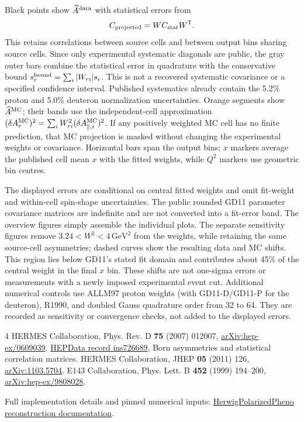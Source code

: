 \documentclass[10pt,a4paper]{article}
\newcommand{\gev}{\mathrm{GeV}}
\begin{document}
Black points show $\widehat A^{\rm data}$ with statistical errors from
\begin{equation}
 C_{\rm projected}=W C_{\rm stat} W^{\mathsf T}.
\end{equation}
This retains correlations between source cells and between output bins sharing
source cells. Since only experimental systematic diagonals are public, the gray
outer bars combine the statistical error in quadrature with the conservative
bound $s_r^{\rm bound}=\sum_i|W_{ri}|s_i$. This is not a recovered systematic
covariance or a specified confidence interval. Published systematics already
contain the 5.2\% proton and 5.0\% deuteron normalization uncertainties.
Orange segments show $\widehat A^{\rm MC}$; their bands use the independent-cell
approximation $(\delta A_r^{\rm MC})^2=\sum_iW_{ri}^2(\delta A_{\parallel,i}^{\rm MC})^2$.
If any positively weighted MC cell has no finite prediction, that MC projection
is masked without changing the experimental weights or covariance.
Horizontal bars span the output bins; $x$ markers average the published cell
mean $x$ with the fitted weights, while $Q^2$ markers use geometric bin centres.

The displayed errors are conditional on central fitted weights and omit
fit-weight and within-cell spin-shape uncertainties. The public rounded GD11
parameter covariance matrices are indefinite and are not converted into a
fit-error band. The overview figures simply assemble the individual plots.
The separate sensitivity figures remove $3.24<W^2<4\,\gev^2$ from the weights,
while retaining the same source-cell asymmetries; dashed curves show the
resulting data and MC shifts. This region lies below GD11's stated fit domain
and contributes about 45\% of the central weight in the final $x$ bin.
These shifts are not one-sigma errors or measurements with a newly imposed
experimental event cut. Additional numerical controls use ALLM97 proton weights
(with GD11-D/GD11-P for the deuteron), R1990, and doubled Gauss quadrature order
from 32 to 64. They are recorded as sensitivity or convergence checks, not
added to the displayed errors.

\small
\begin{thebibliography}{4}
\setlength{\itemsep}{0pt}
 HERMES Collaboration, Phys. Rev. D \textbf{75} (2007) 012007,
\href{https://arxiv.org/abs/hep-ex/0609039}{arXiv:hep-ex/0609039}.
 \href{https://www.hepdata.net/record/ins726689}{HEPData record ins726689},
Born asymmetries and statistical correlation matrices.
 HERMES Collaboration, JHEP \textbf{05} (2011) 126,
\href{https://arxiv.org/abs/1103.5704}{arXiv:1103.5704}.
 E143 Collaboration, Phys. Lett. B \textbf{452} (1999) 194--200,
\href{https://arxiv.org/abs/hep-ex/9808028}{arXiv:hep-ex/9808028}.
\end{thebibliography}
\normalsize
Full implementation details and pinned numerical inputs:
\href{https://github.com/apapaefs/HerwigPolarizedPheno/blob/main/docs/hermes-apar-integrated-data.md}{HerwigPolarizedPheno reconstruction documentation}.
\end{document}
